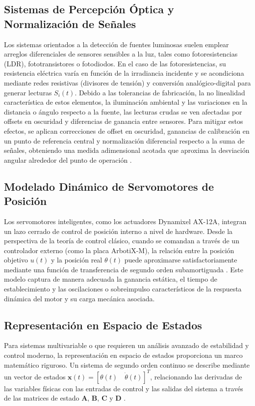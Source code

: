 \documentclass[12pt,a4paper]{article}
\begin{document}
\subsection{Sistemas de Percepción Óptica y Normalización de Señales}
Los sistemas orientados a la detección de fuentes luminosas suelen emplear arreglos diferenciales de sensores sensibles a la luz, tales como fotoresistencias (LDR), fototransistores o fotodiodos. En el caso de las fotoresistencias, su resistencia eléctrica varía en función de la irradiancia incidente y se acondiciona mediante redes resistivas (divisores de tensión) y conversión analógico-digital para generar lecturas $S_i(t)$. Debido a las tolerancias de fabricación, la no linealidad característica de estos elementos, la iluminación ambiental y las variaciones en la distancia o ángulo respecto a la fuente, las lecturas crudas se ven afectadas por offsets en oscuridad y diferencias de ganancia entre sensores. Para mitigar estos efectos, se aplican correcciones de offset en oscuridad, ganancias de calibración en un punto de referencia central y normalización diferencial respecto a la suma de señales, obteniendo una medida adimensional acotada que aproxima la desviación angular alrededor del punto de operación \cite{dorf2016modern, ogata2010modern}.

\subsection{Modelado Dinámico de Servomotores de Posición}
Los servomotores inteligentes, como los actuadores Dynamixel AX-12A, integran un lazo cerrado de control de posición interno a nivel de hardware. Desde la perspectiva de la teoría de control clásico, cuando se comandan a través de un controlador externo (como la placa ArbotiX-M), la relación entre la posición objetivo $u(t)$ y la posición real $\theta(t)$ puede aproximarse satisfactoriamente mediante una función de transferencia de segundo orden subamortiguada \cite{franklin2015feedback}. Este modelo captura de manera adecuada la ganancia estática, el tiempo de establecimiento y las oscilaciones o sobreimpulso característicos de la respuesta dinámica del motor y su carga mecánica asociada.

\subsection{Representación en Espacio de Estados}
Para sistemas multivariable o que requieren un análisis avanzado de estabilidad y control moderno, la representación en espacio de estados proporciona un marco matemático riguroso. Un sistema de segundo orden continuo se describe mediante un vector de estados $\mathbf{x}(t) = [\theta(t) \quad \dot{\theta}(t)]^T$, relacionando las derivadas de las variables físicas con las entradas de control y las salidas del sistema a través de las matrices de estado $\mathbf{A}$, $\mathbf{B}$, $\mathbf{C}$ y $\mathbf{D}$ \cite{ogata2010modern}.
\end{document}
